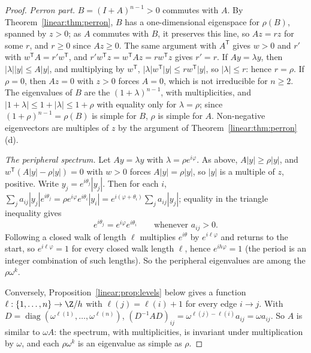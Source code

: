 \begin{proof}
\emph{Perron part.} $B=(I+A)^{n-1}>0$ commutes with $A$. By Theorem~\ref{linear:thm:perron}, $B$ has a one-dimensional eigenspace for
$\rho(B)$, spanned by $z>0$; as $A$ commutes with $B$, it preserves this line, so $Az=rz$ for some $r$, and $r\ge0$ since $Az\ge0$.
The same argument with $A^{\mathsf T}$ gives $w>0$ and $r'$ with $w^{\mathsf T}A=r'w^{\mathsf T}$, and $r'w^{\mathsf T}z=w^{\mathsf
T}Az=rw^{\mathsf T}z$ gives $r'=r$. If $Ay=\lambda y$, then $|\lambda||y|\le A|y|$, and multiplying by $w^{\mathsf T}$,
$|\lambda|w^{\mathsf T}|y|\le rw^{\mathsf T}|y|$, so $|\lambda|\le r$: hence $r=\rho$. If $\rho=0$, then $Az=0$ with $z>0$
forces $A=0$, which is not irreducible for $n\ge2$. The eigenvalues of $B$ are the $(1+\lambda)^{n-1}$, with multiplicities,
and $|1+\lambda|\le1+|\lambda|\le1+\rho$ with equality only for $\lambda=\rho$; since $(1+\rho)^{n-1}=\rho(B)$ is simple for $B$,
$\rho$ is simple for $A$. Non-negative eigenvectors are multiples of $z$ by the argument of Theorem~\ref{linear:thm:perron}(d).

\emph{The peripheral spectrum.} Let $Ay=\lambda y$ with $\lambda=\rho e^{i\varphi}$. As above, $A|y|\ge\rho|y|$, and
$w^{\mathsf T}(A|y|-\rho|y|)=0$ with $w>0$ forces $A|y|=\rho|y|$, so $|y|$ is a multiple of $z$, positive. Write $y_j=e^{i\theta_j}
|y_j|$. Then for each $i$, $\sum_ja_{ij}|y_j|e^{i\theta_j}=\rho e^{i\varphi}e^{i\theta_i}|y_i|=e^{i(\varphi+\theta_i)}\sum_ja_{ij}|y_j|$;
equality in the triangle inequality gives
\[
e^{i\theta_j}=e^{i\varphi}e^{i\theta_i}\qquad\text{whenever }a_{ij}>0.
\]
Following a closed walk of length $\ell$ multiplies $e^{i\theta}$ by $e^{i\ell\varphi}$ and returns to the start, so $e^{i\ell
\varphi}=1$ for every closed walk length $\ell$, hence $e^{ih\varphi}=1$ (the period is an integer combination of such lengths).
So the peripheral eigenvalues are among the $\rho\omega^k$.

Conversely, Proposition~\ref{linear:prop:levels} below gives a function $\ell:\{1,\dots,n\}\to\Z/h$ with $\ell(j)=\ell(i)+1$ for every
edge $i\to j$. With $D=\operatorname{diag}(\omega^{\ell(1)},\dots,\omega^{\ell(n)})$, $(D^{-1}AD)_{ij}=\omega^{\ell(j)-\ell(i)}a_{ij}=
\omega a_{ij}$. So $A$ is similar to $\omega A$: the spectrum, with multiplicities, is invariant under multiplication by $\omega$,
and each $\rho\omega^k$ is an eigenvalue as simple as $\rho$.
\end{proof}

